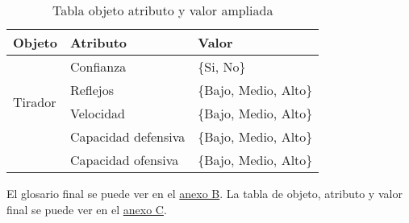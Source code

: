 \begin{table}[]
  \centering
  \caption{Tabla objeto atributo y valor ampliada}
  \label{tab:Tabla objeto atributo y valor ampliada}
  \begin{tabular}{lll}
    Objeto & Atributo & Valor \\ \hline
    \multicolumn{1}{l|}{\multirow{4}{*}{Tirador}} & Confianza & \{Si, No\} \\ \cline{2-3}
    \multicolumn{1}{l|}{} & Reflejos & \{Bajo, Medio, Alto\} \\ \cline{2-3}
    \multicolumn{1}{l|}{} & Velocidad & \{Bajo, Medio, Alto\} \\ \cline{2-3}
    \multicolumn{1}{l|}{} & Capacidad defensiva & \{Bajo, Medio, Alto\} \\ \cline{2-3}
    \multicolumn{1}{l|}{} & Capacidad ofensiva & \{Bajo, Medio, Alto\} \\ \cline{2-3}
  \end{tabular}
\end{table}


El glosario final se puede ver en el \hyperref[cap:glosario sistema experto]{anexo B}.
La tabla de objeto, atributo y valor final se puede ver en el \hyperref[cap:Reglas del sistema experto]{anexo C}.
